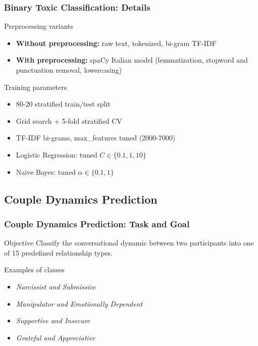\documentclass{beamer}
\begin{document}
\begin{frame}
\frametitle{Binary Toxic Classification: Details}

\begin{block}{Preprocessing variants}
\begin{itemize}
\item \textbf{Without preprocessing:} raw text, tokenized, bi-gram TF-IDF
\item \textbf{With preprocessing:} spaCy Italian model (lemmatization, stopword and punctuation removal, lowercasing)
\end{itemize}
\end{block}

\begin{exampleblock}{Training parameters}
\begin{itemize}
\item 80-20 stratified train/test split
\item Grid search + 5-fold stratified CV
\item TF-IDF bi-grams, max\_features tuned (2000-7000)
\item Logistic Regression: tuned $C \in \{0.1, 1, 10\}$
\item Naive Bayes: tuned $\alpha \in \{0.1, 1\}$
\end{itemize}
\end{exampleblock}

\end{frame}

\subsection{Couple Dynamics Prediction}

\begin{frame}
\frametitle{Couple Dynamics Prediction: Task and Goal}

\begin{block}{Objective}
Classify the conversational dynamic between two participants into one of 15 predefined relationship types.
\end{block}

\begin{block}{Examples of classes}
\begin{itemize}
\item \textit{Narcissist and Submissive}
\item \textit{Manipulator and Emotionally Dependent}
\item \textit{Supportive and Insecure}
\item \textit{Grateful and Appreciative}
\end{itemize}
\end{block}

\end{frame}
\end{document}
